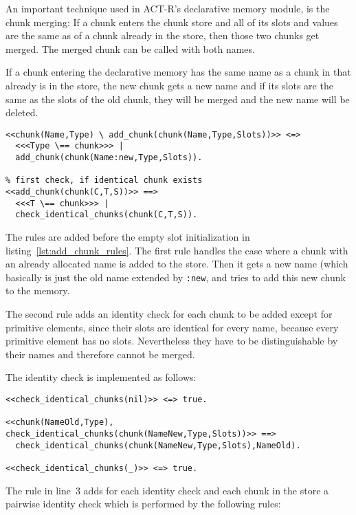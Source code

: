 An important technique used in ACT-R's declarative memory module, is the chunk merging: If a chunk enters the chunk store and all of its slots and values are the same as of a chunk already in the store, then those two chunks get merged. The merged chunk can be called with both names.

If a chunk entering the declarative memory has the same name as a chunk in that already is in the store, the new chunk gets a new name and if its slots are the same as the slots of the old chunk, they will be merged and the new name will be deleted.

\begin{lstlisting}
<<chunk(Name,Type) \ add_chunk(chunk(Name,Type,Slots))>> <=>
  <<<Type \== chunk>>> |
  add_chunk(chunk(Name:new,Type,Slots)).

% first check, if identical chunk exists
<<add_chunk(chunk(C,T,S))>> ==> 
  <<<T \== chunk>>> | 
  check_identical_chunks(chunk(C,T,S)).
\end{lstlisting}

The rules are added before the empty slot initialization in listing~\ref{lst:add_chunk_rules}. The first rule handles the case where a chunk with an already allocated name is added to the store. Then it gets a new name (which basically is just the old name extended by \lstinline|:new|, and tries to add this new chunk to the memory. 

The second rule adds an identity check for each chunk to be added except for primitive elements, since their slots are identical for every name, because every primitive element has no slots. Nevertheless they have to be distinguishable by their names and therefore cannot be merged.

The identity check is implemented as follows:

\begin{lstlisting}
<<check_identical_chunks(nil)>> <=> true.

<<chunk(NameOld,Type), check_identical_chunks(chunk(NameNew,Type,Slots))>> ==> 
  check_identical_chunks(chunk(NameNew,Type,Slots),NameOld).
  
<<check_identical_chunks(_)>> <=> true.
\end{lstlisting}

The rule in line~3 adds for each identity check and each chunk in the store a pairwise identity check which is performed by the following rules:

